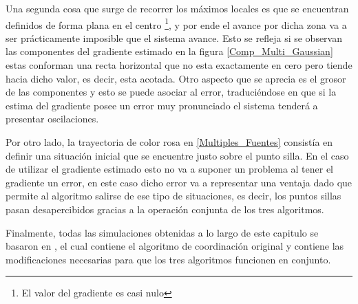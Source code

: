 Una segunda cosa que surge de recorrer los máximos locales es que se encuentran definidos de forma plana en el centro \footnote[11]{El valor del gradiente es casi nulo}, y por ende el avance por dicha zona va a ser prácticamente imposible que el sistema avance. Esto se refleja si se observan las componentes del gradiente estimado en la figura \ref{Comp_Multi_Gaussian} estas conforman una recta horizontal que no esta exactamente en cero pero tiende hacia dicho valor, es decir, esta acotada. Otro aspecto que se aprecia es el grosor de las componentes y esto se puede asociar al error, traduciéndose en que si la estima del gradiente posee un error muy pronunciado el sistema tenderá a presentar oscilaciones.

Por otro lado, la trayectoria de color rosa en \ref{Multiples_Fuentes} consistía en definir una situación inicial que se encuentre justo sobre el punto silla. En el caso de utilizar el gradiente estimado esto no va a suponer un problema al tener el gradiente un error, en este caso dicho error va a representar una ventaja dado que permite al algoritmo salirse de ese tipo de situaciones, es decir, los puntos sillas pasan desapercibidos gracias a la operación conjunta de los tres algoritmos.

Finalmente, todas las simulaciones obtenidas a lo largo de este capitulo se basaron en \cite{Git_Hector}, el cual contiene el algoritmo de coordinación original y \cite{Git_todos} contiene las modificaciones necesarias para que los tres algoritmos funcionen en conjunto.





